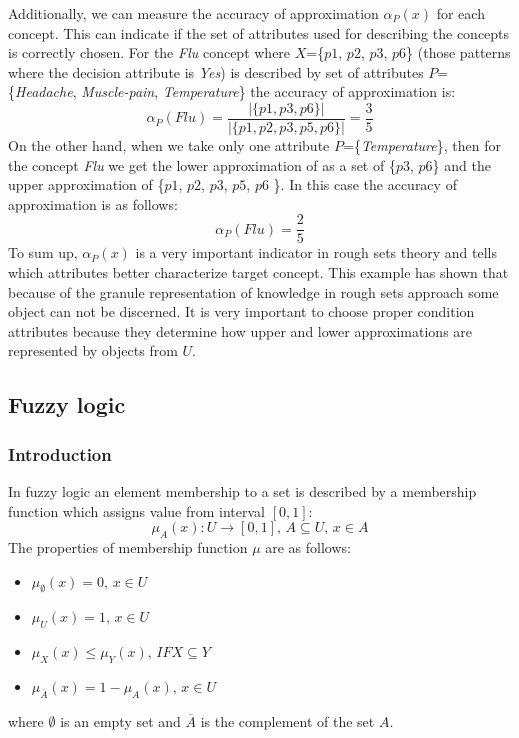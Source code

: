 Additionally, we can measure the accuracy of approximation $\alpha_P(x)$ for each concept.
This can indicate if the set of attributes used for describing the concepts is correctly
chosen. For the \textit{Flu} concept where $X$=\{$p1$, $p2$, $p3$, $p6$\}
(those patterns where the decision attribute is \textit{Yes}) is described by
set of attributes $P$=\{\textit{Headache}, \textit{Muscle-pain},
\textit{Temperature}\} the accuracy of approximation is:
$$\alpha_P(Flu) = \frac{|\{p1, p3, p6\}|}{|\{p1, p2, p3, p5, p6\}|} = \frac{3}{5}$$
On the other hand, when we take only one attribute
$P$=\{\textit{Temperature}\}, then for the concept \textit{Flu} we get the lower approximation of 
as a set of \{$p3$, $p6$\} and the upper approximation of \{$p1$, $p2$, $p3$,
$p5$, $p6$ \}. In this case the accuracy of approximation is as follows:
$$\alpha_P(Flu) = \frac{2}{5}$$
To sum up, $\alpha_P(x)$ is a very important indicator in
rough sets theory and tells which attributes better characterize target
concept. This example has shown that because of the granule representation of
knowledge in rough sets approach some object can not be discerned. It is very
important to choose proper condition attributes because they determine how
upper and lower approximations are represented by objects from $U$. 


\subsection{Fuzzy logic}
\label{cha:Fuzzy_logic}
\subsubsection{Introduction}
In fuzzy logic an element membership to a set is described by a membership function 
which assigns value from interval $[0, 1]$:
\begin{equation}
    \mu_A(x):U\rightarrow [0,1], \, A \subseteq U, \, x \in A
    \label{eq:fuzzy_function}
\end{equation}
The properties of membership function $\mu$ are as follows:
\begin{itemize}
    \item $\mu_{\emptyset}(x) = 0, \, x \in U$
    \item  $\mu_{U}(x) = 1, \, x \in U$
    \item  $\mu_{X}(x) \leq \mu_{Y}(x), \, IF X \subseteq Y$
    \item  $\mu_{\overline{A}}(x) = 1 - \mu_{A}(x), \, x \in U$
\end{itemize}
where $\emptyset$ is an empty set and $\overline{A}$ is the complement of the
set $A$.

